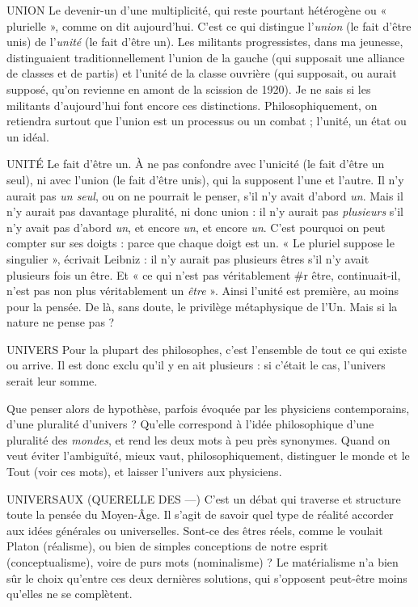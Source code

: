 UNION Le devenir-un d’une multiplicité, qui reste pourtant hétérogène ou
« plurielle », comme on dit aujourd’hui. C’est ce qui distingue
l'{\it union} (le fait d’être unis) de l’{\it unité} (le fait d’être un). Les militants progressistes,
dans ma jeunesse, distinguaient traditionnellement l’union de la gauche
(qui supposait une alliance de classes et de partis) et l’unité de la classe ouvrière
(qui supposait, ou aurait supposé, qu’on revienne en amont de la scission de
1920). Je ne sais si les militants d’aujourd’hui font encore ces distinctions. Philosophiquement,
on retiendra surtout que l’union est un processus ou un
combat ; l’unité, un état ou un idéal.

UNITÉ Le fait d’être un. À ne pas confondre avec l’unicité (le fait d’être un
seul), ni avec l’union (le fait d’être unis), qui la supposent l’une et
l’autre. Il n’y aurait pas {\it un seul}, ou on ne pourrait le penser, s’il n’y avait
d’abord {\it un}. Mais il n’y aurait pas davantage pluralité, ni donc union : il n’y
aurait pas {\it plusieurs} s’il n’y avait pas d’abord {\it un}, et encore {\it un}, et encore {\it un}.
C’est pourquoi on peut compter sur ses doigts : parce que chaque doigt est un.
« Le pluriel suppose le singulier », écrivait Leibniz : il n’y aurait pas plusieurs
êtres s’il n’y avait plusieurs fois un être. Et « ce qui n’est pas véritablement #r
être, continuait-il, n’est pas non plus véritablement un {\it être} ». Ainsi l’unité est
première, au moins pour la pensée. De là, sans doute, le privilège métaphysique
de l’Un. Mais si la nature ne pense pas ?

UNIVERS Pour la plupart des philosophes, c’est l’ensemble de tout ce qui
existe ou arrive. Il est donc exclu qu’il y en ait plusieurs : si c’était
le cas, l’univers serait leur somme.

Que penser alors de hypothèse, parfois évoquée par les physiciens contemporains,
d’une pluralité d’univers ? Qu’elle correspond à l’idée philosophique
d’une pluralité des {\it mondes}, et rend les deux mots à peu près synonymes. Quand
on veut éviter l'ambiguïté, mieux vaut, philosophiquement, distinguer le
monde et le Tout (voir ces mots), et laisser l’univers aux physiciens.

UNIVERSAUX (QUERELLE DES —) C’est un débat qui traverse et structure
toute la pensée du Moyen-Âge. Il
s’agit de savoir quel type de réalité accorder aux idées générales ou universelles.
Sont-ce des êtres réels, comme le voulait Platon (réalisme), ou bien de simples
conceptions de notre esprit (conceptualisme), voire de purs mots (nominalisme) ?
Le matérialisme n’a bien sûr le choix qu’entre ces deux dernières solutions,
qui s'opposent peut-être moins qu’elles ne se complètent.

